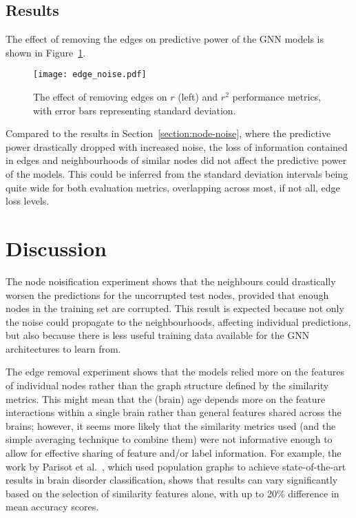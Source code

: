 \subsection{Results}
The effect of removing the edges on predictive power of the GNN models is shown in Figure~\ref{figure:edge-noise}.

\begin{figure}[h]
    \centering
    \texttt{[image: edge\_noise.pdf]}
    \caption{The effect of removing edges on $r$ (left) and $r^2$ performance metrics, with error bars representing standard deviation.}\label{figure:edge-noise}
\end{figure}

Compared to the results in Section~\ref{section:node-noise}, where the predictive power drastically dropped with increased noise, the loss of information contained in edges and neighbourhoods of similar nodes did not affect the predictive power of the models. This could be inferred from the standard deviation intervals being quite wide for both evaluation metrics, overlapping across most, if not all, edge loss levels.

\section{Discussion}
 The node noisification experiment shows that the neighbours could drastically worsen the predictions for the uncorrupted test nodes, provided that enough nodes in the training set are corrupted. This result is expected because not only the noise could propagate to the neighbourhoods, affecting individual predictions, but also because there is less useful training data available for the GNN architectures to learn from.
 
The edge removal experiment shows that the models relied more on the features of individual nodes rather than the graph structure defined by the similarity metrics. This might mean that the (brain) age depends more on the feature interactions within a single brain rather than general features shared across the brains; however, it seems more likely that the similarity metrics used (and the simple averaging technique to combine them) were not informative enough to allow for effective sharing of feature and/or label information. For example, the work by Parisot et al.~\cite{parisot2018disease}, which used population graphs to achieve state-of-the-art results in brain disorder classification, shows that results can vary significantly based on the selection of similarity features alone, with up to 20\% difference in mean accuracy scores. 

